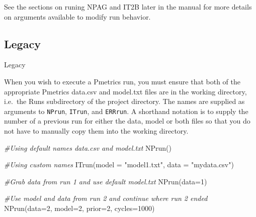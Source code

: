 \documentclass[
]{book}
\newenvironment{Shaded}{\begin{snugshade}}{\end{snugshade}}
\newcommand{\AttributeTok}[1]{\textcolor[rgb]{0.77,0.63,0.00}{#1}}
\newcommand{\CommentTok}[1]{\textcolor[rgb]{0.56,0.35,0.01}{\textit{#1}}}
\newcommand{\DecValTok}[1]{\textcolor[rgb]{0.00,0.00,0.81}{#1}}
\newcommand{\FunctionTok}[1]{\textcolor[rgb]{0.00,0.00,0.00}{#1}}
\newcommand{\NormalTok}[1]{#1}
\newcommand{\SpecialCharTok}[1]{\textcolor[rgb]{0.00,0.00,0.00}{#1}}
\newcommand{\StringTok}[1]{\textcolor[rgb]{0.31,0.60,0.02}{#1}}
\begin{document}
\begin{Shaded}
\end{Shaded}

See the sections on runing NPAG and IT2B later in the manual for more details on arguments available to modify run behavior.

\hypertarget{legacy}{%
\subsection{Legacy}\label{legacy}}

{Legacy}

When you wish to execute a Pmetrics run, you must ensure that
both of the appropriate Pmetrics data.csv and model.txt files are in the working
directory, i.e.~the Runs subdirectory of the project directory. The names are supplied as arguments to \texttt{NPrun}, \texttt{ITrun}, and \texttt{ERRrun}. A shorthand notation is to supply the number of a previous run for either the data, model or both files so that you do not have to manually copy them into the working directory.

\begin{Shaded}
\begin{Highlighting}[]
\CommentTok{\#Using default names data.csv and model.txt}
\FunctionTok{NPrun}\NormalTok{()}

\CommentTok{\#Using custom names}
\FunctionTok{ITrun}\NormalTok{(}\AttributeTok{model =} \StringTok{"model1.txt"}\NormalTok{, }\AttributeTok{data =} \StringTok{"mydata.csv"}\NormalTok{)}

\CommentTok{\#Grab data from run 1 and use default model.txt}
\FunctionTok{NPrun}\NormalTok{(}\AttributeTok{data=}\DecValTok{1}\NormalTok{)}

\CommentTok{\#Use model and data from run 2 and continue where run 2 ended}
\FunctionTok{NPrun}\NormalTok{(}\AttributeTok{data=}\DecValTok{2}\NormalTok{, }\AttributeTok{model=}\DecValTok{2}\NormalTok{, }\AttributeTok{prior=}\DecValTok{2}\NormalTok{, }\AttributeTok{cycles=}\DecValTok{1000}\NormalTok{)}
\end{Highlighting}
\end{Shaded}
\end{document}
